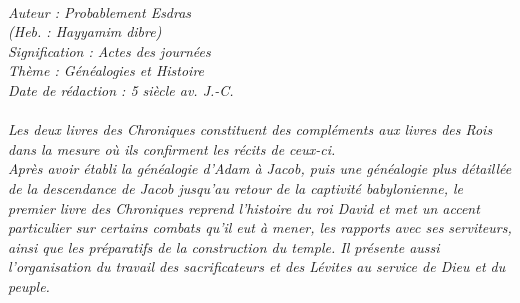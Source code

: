 \BFont
\noindent\hrulefill
{\footnotesize
\textit{
\bigskip
{\centering{}
\\Auteur : Probablement Esdras
\\(Heb. : Hayyamim dibre)
\\Signification : Actes des journées
\\Thème : Généalogies et Histoire
\\Date de rédaction : 5 siècle av. J.-C.\\}
}
\textit{
\\Les deux livres des Chroniques constituent des compléments aux livres des Rois dans la mesure où ils confirment les récits de ceux-ci.
\\Après avoir établi la généalogie d'Adam à Jacob, puis une généalogie plus détaillée de la descendance de Jacob jusqu'au retour de la captivité babylonienne, le premier livre des Chroniques reprend l'histoire du roi David et met un accent particulier sur certains combats qu'il eut à mener, les rapports avec ses serviteurs, ainsi que les préparatifs de la construction du temple. Il présente aussi l'organisation du travail des sacrificateurs et des Lévites au service de
Dieu et du peuple.\bigskip
}
}
\par\nobreak\noindent\hrulefill
